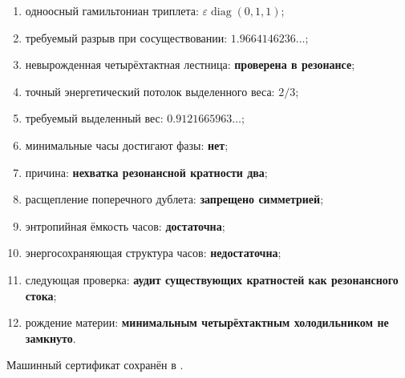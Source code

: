 \begin{protocol}
\begin{enumerate}
 \item одноосный гамильтониан триплета:
 \textbf{$\varepsilon\operatorname{diag}(0,1,1)$};
 \item требуемый разрыв при сосуществовании:
 \textbf{$1.9664146236\ldots$};
 \item невырожденная четырёхтактная лестница:
 \textbf{проверена в резонансе};
 \item точный энергетический потолок выделенного веса:
 \textbf{$2/3$};
 \item требуемый выделенный вес: \textbf{$0.9121665963\ldots$};
 \item минимальные часы достигают фазы: \textbf{нет};
 \item причина: \textbf{нехватка резонансной кратности два};
 \item расщепление поперечного дублета: \textbf{запрещено симметрией};
 \item энтропийная ёмкость часов: \textbf{достаточна};
 \item энергосохраняющая структура часов: \textbf{недостаточна};
 \item следующая проверка:
 \textbf{аудит существующих кратностей как резонансного стока};
 \item рождение материи:
 \textbf{минимальным четырёхтактным холодильником не замкнуто}.
\end{enumerate}
\end{protocol}

Машинный сертификат сохранён в
.